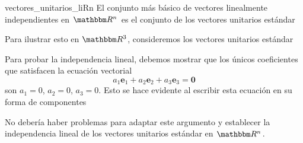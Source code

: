 \newpage

\begin{examplebox}{}{vectores_unitarios_liRn}
    El conjunto más básico de vectores linealmente independientes en $\RR[n]$ es el conjunto de los vectores unitarios estándar
    \begin{matrizn}
    \end{matrizn}
    Para ilustrar esto en $\RR[3]$, consideremos los vectores unitarios estándar
    \begin{matrizn}
    \end{matrizn}
    Para probar la independencia lineal, debemos mostrar que los únicos coeficientes que satisfacen la ecuación vectorial
    $$a_1\mathbf{e}_1 + a_2\mathbf{e}_2 + a_3\mathbf{e}_3 = \mathbf{0}$$
    son $a_1 = 0$, $a_2 = 0$, $a_3 = 0$. Esto se hace evidente al escribir esta ecuación en su forma de componentes
    \begin{matrizn}
    \end{matrizn}
    No debería haber problemas para adaptar este argumento y establecer la independencia lineal de los vectores unitarios estándar en $\RR[n]$.
\end{examplebox}

